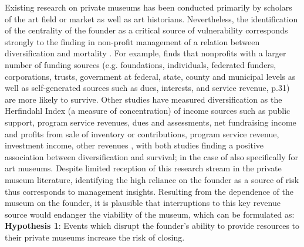 \documentclass[12pt]{article}
\begin{document}
Existing research on private museums has been conducted primarily by scholars of the art field or market as well as art historians.
Nevertheless, the identification of the centrality of the founder as a critical source of vulnerability corresponds strongly to the finding in non-profit management of a relation between diversification and mortality \parencite{Tuckman_Chang_1991_vulnerability,Hung_Hager_2018_diversification}.
For example, \textcite{Bielefeld_1994_survival} finds that nonprofits with a larger number of funding sources (e.g. foundations, individuals, federated funders, corporations, trusts, government at federal, state, county and municipal levels as well as self-generated sources such as dues, interests, and service revenue, p.31) are more likely to survive.
Other studies have measured diversification as the Herfindahl Index (a measure of concentration) of income sources such as public support, program service revenues, dues and assessments, net fundraising income and profits from sale of inventory \parencite[p.381]{Hager_2001_vulnerability} or contributions, program service revenue, investment income, other revenues \parencite[p.37]{Lu_Shon_Zhang_2019_dissolution}, with both studies finding a positive association between diversification and survival; in the case of \textcite{Hager_2001_vulnerability} also specifically for art museums.
Despite limited reception of this research stream in the private museum literature, identifying the high reliance on the founder as a source of risk thus corresponds to management insights. 
Resulting from the dependence of the museum on the founder, it is plausible that interruptions to this key revenue source would endanger the viability of the museum, which can be formulated as: 
\bigbreak
\noindent
\textbf{Hypothesis 1}: Events which disrupt the founder's ability to provide resources to their private museums increase the risk of closing. 
\end{document}
